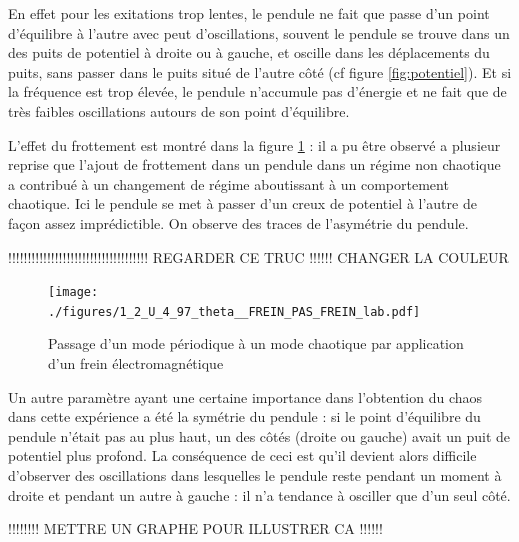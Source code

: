 \documentclass[a4paper,12pt,oneside]{article}
\begin{document}
En effet pour les exitations trop lentes, le pendule ne fait que passe d'un point d'équilibre à l'autre avec peut d'oscillations, souvent le pendule se trouve dans un des puits de potentiel à droite ou à gauche, et oscille dans les déplacements du puits, sans passer dans le puits situé de l'autre côté (cf figure \ref{fig:potentiel}). Et si la fréquence est trop élevée, le pendule n'accumule pas d'énergie et ne fait que de très faibles oscillations autours de son point d'équilibre.

L'effet du frottement est montré dans la figure \ref{fig:1_2_U_4_97_theta__FREIN_PAS_FREIN_lab} : il a pu être observé a plusieur reprise que l'ajout de frottement dans un pendule dans un régime non chaotique a contribué à un changement de régime aboutissant à un comportement chaotique. Ici le pendule se met à passer d'un creux de potentiel à l'autre de façon assez imprédictible. On observe des traces de l'asymétrie du pendule. 

!!!!!!!!!!!!!!!!!!!!!!!!!!!!!!!!!!!! REGARDER CE TRUC !!!!!! CHANGER LA COULEUR
\begin{figure}[h!]
  \begin{center}
  \texttt{[image: ./figures/1\_2\_U\_4\_97\_theta\_\_FREIN\_PAS\_FREIN\_lab.pdf]}
  \caption{Passage d'un mode périodique à un mode chaotique par application d'un frein électromagnétique} \label{fig:1_2_U_4_97_theta__FREIN_PAS_FREIN_lab}
  \end{center}
\end{figure}


Un autre paramètre ayant une certaine importance dans l'obtention du chaos dans cette expérience a été la symétrie du pendule : si le point d'équilibre du pendule n'était pas au plus haut, un des côtés (droite ou gauche) avait un puit de potentiel plus profond. La conséquence de ceci est qu'il devient alors difficile d'observer des oscillations dans lesquelles le pendule reste pendant un moment à droite et pendant un autre à gauche : il n'a tendance à osciller que d'un seul côté. 


!!!!!!!! METTRE UN GRAPHE POUR ILLUSTRER CA !!!!!!


















\end{document}
